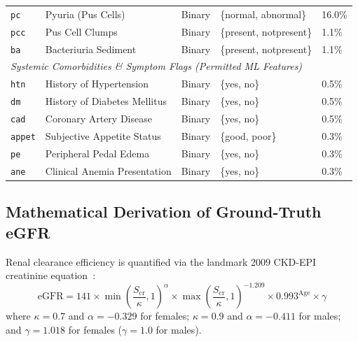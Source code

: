 \documentclass[conference]{IEEEtran}
\begin{document}
\begin{table}[htbp]
\begin{tabularx}{\columnwidth}{lXlll}
\texttt{pc} & Pyuria (Pus Cells) & Binary & \{normal, abnormal\} & 16.0\% \\
\texttt{pcc} & Pus Cell Clumps & Binary & \{present, notpresent\} & 1.1\% \\
\texttt{ba} & Bacteriuria Sediment & Binary & \{present, notpresent\} & 1.1\% \\
\midrule
\multicolumn{5}{l}{\textit{Systemic Comorbidities \& Symptom Flags (Permitted ML Features)}} \\
\texttt{htn} & History of Hypertension & Binary & \{yes, no\} & 0.5\% \\
\texttt{dm} & History of Diabetes Mellitus & Binary & \{yes, no\} & 0.5\% \\
\texttt{cad} & Coronary Artery Disease & Binary & \{yes, no\} & 0.5\% \\
\texttt{appet} & Subjective Appetite Status & Binary & \{good, poor\} & 0.3\% \\
\texttt{pe} & Peripheral Pedal Edema & Binary & \{yes, no\} & 0.3\% \\
\texttt{ane} & Clinical Anemia Presentation & Binary & \{yes, no\} & 0.3\% \\
\bottomrule
\end{tabularx}
\end{table}

\subsection{Mathematical Derivation of Ground-Truth eGFR}
Renal clearance efficiency is quantified via the landmark 2009 CKD-EPI creatinine equation~\cite{levey2009new}:
\begin{equation}
\label{eq:ckdepi}
\text{eGFR} = 141 \times \min\left(\frac{S_{\text{cr}}}{\kappa}, 1\right)^\alpha \times \max\left(\frac{S_{\text{cr}}}{\kappa}, 1\right)^{-1.209} \times 0.993^{\text{Age}} \times \gamma
\end{equation}
where $\kappa = 0.7$ and $\alpha = -0.329$ for females; $\kappa = 0.9$ and $\alpha = -0.411$ for males; and $\gamma = 1.018$ for females ($\gamma = 1.0$ for males).
\end{document}
